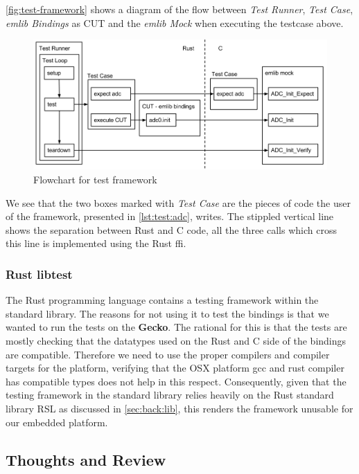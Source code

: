 \autoref{fig:test-framework} shows a diagram of the flow between \textit{Test Runner}, \textit{Test Case}, \textit{emlib Bindings} as \gls{CUT} and the \textit{emlib Mock} when executing the testcase above.

\begin{figure}[H]
  \begin{center}
    \includegraphics[scale=0.3]{figures/testframework}
  \end{center}
  \caption{Flowchart for test framework}
  \label{fig:test-framework}
\end{figure}

We see that the two boxes marked with \textit{Test Case} are the pieces of code the user of the framework, presented in \autoref{lst:test:adc}, writes.
The stippled vertical line shows the separation between Rust and C code, all the three calls which cross this line is implemented using the Rust \gls{ffi}.

\subsubsection{Rust libtest}

The Rust programming language contains a testing framework within the standard library.
The reasons for not using it to test the bindings is that we wanted to run the tests on the \textbf{Gecko}.
The rational for this is that the tests are mostly checking that the datatypes used on the Rust and C side of the bindings are compatible.
Therefore we need to use the proper compilers and compiler targets for the platform, verifying that the OSX platform gcc and rust compiler has compatible types does not help in this respect.
Consequently, given that the testing framework in the standard library relies heavily on the Rust standard library RSL as discussed in \autoref{sec:back:lib}, this renders the framework unusable for our embedded platform.

\subsection{Thoughts and Review}

